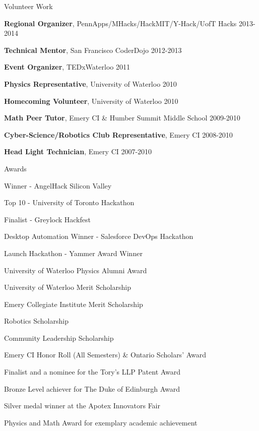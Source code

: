 \documentclass[oneside]{resume}
\begin{document}
  \begin{rSection}{Volunteer Work}

    \begin{rSubListing}
      \item {{\bfseries Regional Organizer}, PennApps/MHacks/HackMIT/Y-Hack/UofT Hacks \hfill 2013-2014}
      \item {{\bfseries Technical Mentor}, San Francisco CoderDojo \hfill 2012-2013}
      \item {{\bfseries Event Organizer}, TEDxWaterloo \hfill 2011}
      \item {{\bfseries Physics Representative}, University of Waterloo \hfill 2010}
      \item {{\bfseries Homecoming Volunteer}, University of Waterloo \hfill 2010}
      \item {{\bfseries Math Peer Tutor}, Emery CI \& Humber Summit Middle School \hfill 2009-2010}
      \item {{\bfseries Cyber-Science/Robotics Club Representative}, Emery CI \hfill 2008-2010}
      \item {{\bfseries Head Light Technician}, Emery CI \hfill 2007-2010}
    \end{rSubListing}

  \end{rSection}


  \begin{rSection}{Awards}

    \begin{rSubListing}
      \item Winner - AngelHack Silicon Valley
      \item Top 10 - University of Toronto Hackathon
      \item Finalist - Greylock Hackfest
      \item Desktop Automation Winner - Salesforce DevOps Hackathon
      \item Launch Hackathon - Yammer Award Winner
      \item University of Waterloo Physics Alumni Award
      \item University of Waterloo Merit Scholarship
      \item Emery Collegiate Institute Merit Scholarship
      \item Robotics Scholarship
      \item Community Leadership Scholarship
      \item Emery CI Honor Roll (All Semesters) \& Ontario Scholars’ Award
      \item Finalist and a nominee for the Tory’s LLP Patent Award
      \item Bronze Level achiever for The Duke of Edinburgh Award
      \item Silver medal winner at the Apotex Innovators Fair
      \item Physics and Math Award for exemplary academic achievement
    \end{rSubListing}

  \end{rSection}
\end{document}
